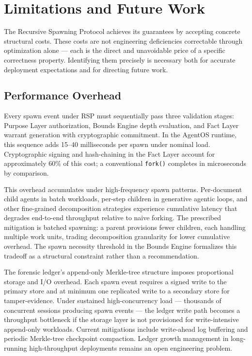 \section{Limitations and Future Work}
\label{sec:rs-limitations}

The Recursive Spawning Protocol achieves its guarantees by accepting concrete structural costs. These costs are not engineering deficiencies correctable through optimization alone — each is the direct and unavoidable price of a specific correctness property. Identifying them precisely is necessary both for accurate deployment expectations and for directing future work.

\subsection{Performance Overhead}
\label{sec:rs-perf-overhead}

Every spawn event under RSP must sequentially pass three validation stages: Purpose Layer authorization, Bounds Engine depth evaluation, and Fact Layer warrant generation with cryptographic commitment. In the AgentOS runtime, this sequence adds \numrange{15}{40} milliseconds per spawn under nominal load. Cryptographic signing and hash-chaining in the Fact Layer account for approximately 60\% of this cost; a conventional \texttt{fork()} completes in microseconds by comparison.

This overhead accumulates under high-frequency spawn patterns. Per-document child agents in batch workloads, per-step children in generative agentic loops, and other fine-grained decomposition strategies experience cumulative latency that degrades end-to-end throughput relative to naive forking. The prescribed mitigation is batched spawning: a parent provisions fewer children, each handling multiple work units, trading decomposition granularity for lower cumulative overhead. The spawn necessity threshold in the Bounds Engine formalizes this tradeoff as a structural constraint rather than a recommendation.

The forensic ledger's append-only Merkle-tree structure imposes proportional storage and I/O overhead. Each spawn event requires a signed write to the primary store and at minimum one replicated write to a secondary store for tamper-evidence. Under sustained high-concurrency load — thousands of concurrent sessions producing spawn events — the ledger write path becomes a throughput bottleneck if the storage layer is not provisioned for write-intensive append-only workloads. Current mitigations include write-ahead log buffering and periodic Merkle-tree checkpoint compaction. Ledger growth management in long-running high-throughput deployments remains an open engineering problem.


